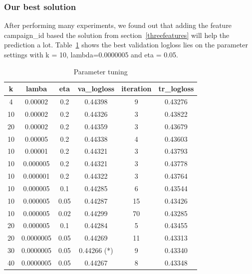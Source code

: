 \documentclass[fleqn,10pt]{SelfArx} %
\begin{document}
\subsubsection{Our best solution}
After performing many experiments, we found out that adding the feature campaign\_id based the solution from section~\ref{threefeatures} will help the prediction a lot. Table~\ref{tab:tuning} shows the best validation logloss lies on the parameter settings with k = 10, lambda=0.0000005 and eta = 0.05.

\begin{table}[!htbp]
\begin{center}
 \begin{tabular}{ c|c|c|c|c|c }\hline\hline 
k      &   lamba	 &    eta &   va\_logloss  &  iteration  &  tr\_logloss \\ \hline \hline
4     &    0.00002  &  0.2    & 0.44398     &           9    &  0.43276      \\
10    &    0.00002  &  0.2    & 0.44326      &          3   &   0.43822     \\
20    &    0.00002  &  0.2    & 0.44359        &        3    &  0.43679     \\
10    &    0.00005  &  0.2    & 0.44338        &        4    &  0.43603      \\
10    &    0.00001  &  0.2    & 0.44321     &           3    &  0.43793      \\
10    &    0.000005 &  0.2    & 0.44321      &          3   &   0.43778       \\ 
10    &    0.000001 &  0.2    & 0.44322        &        3    &  0.43764     \\
10    &    0.000005 &  0.1    & 0.44285          &      6    &  0.43544     \\
10    &    0.000005  & 0.05   & 0.44287   &             15  &   0.43426    \\
10    &    0.000005  & 0.02  &  0.44299    &            70   &  0.43285      \\
20    &    0.000005  & 0.1   &  0.44284      &          5    &  0.43455     \\
20    &    0.0000005 & 0.05  &  0.44269     &           11  &   0.43313    \\
30    &   0.0000005 & 0.05   & 0.44266  (*)   &            9 &     0.43340   \\  
40    &   0.0000005 & 0.05  &  0.44267        &        8     & 0.43348 \\ \hline\hline
  \end{tabular}
\end{center}
\caption{Parameter tuning}\label{tab:tuning}
\end{table}
\end{document}

